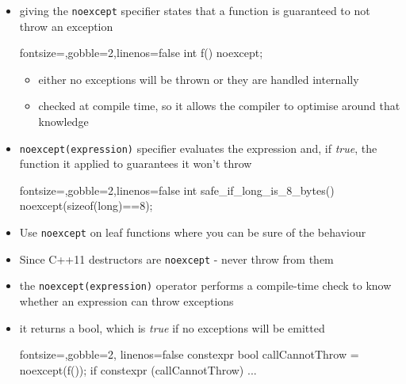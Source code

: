 \begin{frame}[fragile]
  \begin{block}{}
    \begin{itemize}
      \item giving the \texttt{noexcept} specifier states that a function is guaranteed to not throw an exception
      \begin{cppcode*}{fontsize=\footnotesize,gobble=2,linenos=false}
        int f() noexcept;
      \end{cppcode*}
      \begin{itemize}
        \item either no exceptions will be thrown or they are handled internally
        \item checked at compile time, so it allows the compiler to optimise around that knowledge
      \end{itemize}
      \item \texttt{noexcept(expression)} specifier evaluates the expression and, if \textit{true}, the function it applied to guarantees it won't throw
        \begin{cppcode*}{fontsize=\footnotesize,gobble=2,linenos=false}
          int safe_if_long_is_8_bytes() noexcept(sizeof(long)==8);
        \end{cppcode*}
      \item Use \texttt{noexcept} on leaf functions where you can be sure of the behaviour
      \item Since C++11 destructors are \texttt{noexcept} - never throw from them
    \end{itemize}
  \end{block}
\end{frame}


\begin{frame}[fragile]
  \begin{block}{}
    \begin{itemize}
      \item the \texttt{noexcept(expression)} operator performs a compile-time check to know whether an expression can throw exceptions
      \item it returns a bool, which is \textit{true} if no exceptions will be emitted
        \begin{cppcode*}{fontsize=\footnotesize,gobble=2, linenos=false}
          constexpr bool callCannotThrow = noexcept(f());
          if constexpr (callCannotThrow) { ... }
        \end{cppcode*}
    \end{itemize}
  \end{block}
\end{frame}
